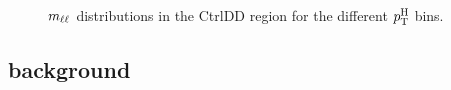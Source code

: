 \begin{figure}[htb]
\caption{$m_{\ell\ell}$ distributions in the CtrlDD region for the different $p_\mathrm{T}^\mathrm{H}$ bins.\label{fig:mllCtrlDD}}
\end{figure}

























\clearpage
\subsection{\WW background \label{sec:WWBackground}}

